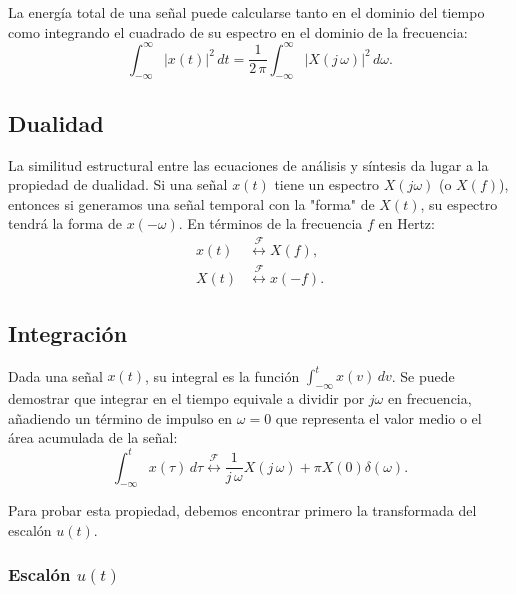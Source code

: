 \documentclass[11pt,a4paper,openany]{book}
\begin{document}
La energía total de una señal puede calcularse tanto en el dominio del tiempo como integrando el cuadrado de su espectro en el dominio de la frecuencia:
\begin{equation}
	\int_{-\infty}^{\infty} |x(t)|^{2} \, dt = \frac{1}{2 \, \pi} \int_{-\infty}^{\infty} |X(j \, \omega)|^{2} \, d\omega .
\end{equation}

\subsection{Dualidad}

La similitud estructural entre las ecuaciones de análisis y síntesis da lugar a la propiedad de dualidad. Si una señal $x(t)$ tiene un espectro $X(j\omega)$ (o $X(f)$), entonces si generamos una señal temporal con la "forma" de $X(t)$, su espectro tendrá la forma de $x(-\omega)$. En términos de la frecuencia $f$ en Hertz:
\begin{align}
	x(t) &\stackrel{\mathcal{F}}{\longleftrightarrow} X(f), \\
	X(t) &\stackrel{\mathcal{F}}{\longleftrightarrow} x(-f).
\end{align}

\subsection{Integración}

Dada una señal $x(t)$, su integral es la función $\int_{-\infty}^{t} x(v) \, dv$. Se puede demostrar que integrar en el tiempo equivale a dividir por $j\omega$ en frecuencia, añadiendo un término de impulso en $\omega=0$ que representa el valor medio o el área acumulada de la señal:
\begin{equation}
	\int_{-\infty}^{t} x(\tau) \, d\tau \stackrel{\mathcal{F}}{\longleftrightarrow} \frac{1}{j \, \omega} X(j \, \omega) + \pi X(0) \delta(\omega).
\end{equation}

Para probar esta propiedad, debemos encontrar primero la transformada del escalón $u(t)$.

\subsubsection{Escalón $u(t)$}
\end{document}
